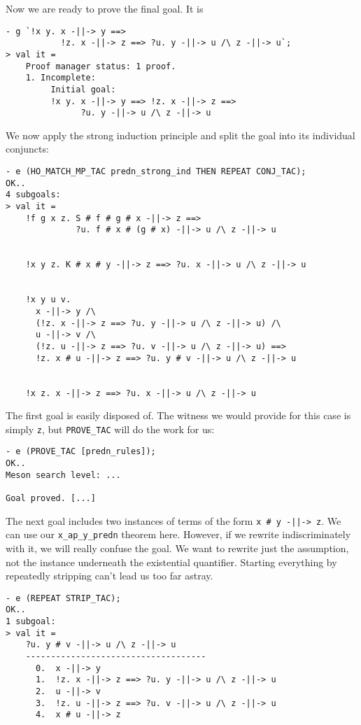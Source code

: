 \documentclass[12pt]{article}
\begin{document}
Now we are ready to prove the final goal.  It is
\begin{session}\begin{verbatim}
- g `!x y. x -||-> y ==>
           !z. x -||-> z ==> ?u. y -||-> u /\ z -||-> u`;
> val it =
    Proof manager status: 1 proof.
    1. Incomplete:
         Initial goal:
         !x y. x -||-> y ==> !z. x -||-> z ==>
               ?u. y -||-> u /\ z -||-> u
\end{verbatim}\end{session}
We now apply the strong induction principle and split the goal into
its individual conjuncts:
\begin{session}\begin{verbatim}
- e (HO_MATCH_MP_TAC predn_strong_ind THEN REPEAT CONJ_TAC);
OK..
4 subgoals:
> val it =
    !f g x z. S # f # g # x -||-> z ==>
              ?u. f # x # (g # x) -||-> u /\ z -||-> u


    !x y z. K # x # y -||-> z ==> ?u. x -||-> u /\ z -||-> u


    !x y u v.
      x -||-> y /\
      (!z. x -||-> z ==> ?u. y -||-> u /\ z -||-> u) /\
      u -||-> v /\
      (!z. u -||-> z ==> ?u. v -||-> u /\ z -||-> u) ==>
      !z. x # u -||-> z ==> ?u. y # v -||-> u /\ z -||-> u


    !x z. x -||-> z ==> ?u. x -||-> u /\ z -||-> u
\end{verbatim}\end{session}
The first goal is easily disposed of.  The witness we would provide
for this case is simply \texttt{z}, but \texttt{PROVE\_TAC} will do
the work for us:
\begin{session}\begin{verbatim}
- e (PROVE_TAC [predn_rules]);
OK..
Meson search level: ...

Goal proved. [...]
\end{verbatim}\end{session}
    The next goal includes two instances of terms of the form
    \verb!x # y -||-> z!.  We can use our \verb!x_ap_y_predn!
    theorem here.  However, if we rewrite indiscriminately with it, we
    will really confuse the goal.  We want to rewrite just the
    assumption, not the instance underneath the existential
    quantifier.  Starting everything by repeatedly stripping can't
    lead us too far astray.
\begin{session}\begin{verbatim}
- e (REPEAT STRIP_TAC);
OK..
1 subgoal:
> val it =
    ?u. y # v -||-> u /\ z -||-> u
    ------------------------------------
      0.  x -||-> y
      1.  !z. x -||-> z ==> ?u. y -||-> u /\ z -||-> u
      2.  u -||-> v
      3.  !z. u -||-> z ==> ?u. v -||-> u /\ z -||-> u
      4.  x # u -||-> z
\end{verbatim}\end{session}
\end{document}
